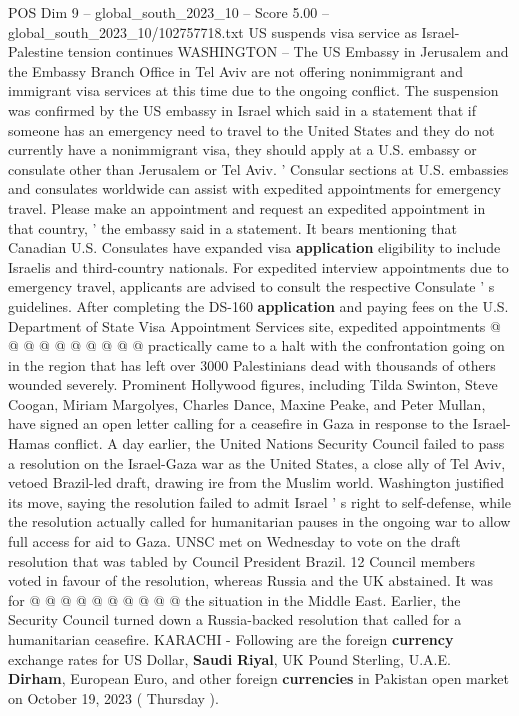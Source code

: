 \begin{textsample}{POS Dim 9 – global\_south\_2023\_10 – Score 5.00 – global\_south\_2023\_10/102757718.txt}  \label{ex:f9_pos_082}
US suspends visa service as Israel-Palestine tension continues WASHINGTON -- The US Embassy in Jerusalem and the Embassy Branch Office in Tel Aviv are not offering nonimmigrant and immigrant visa services at this time due to the ongoing conflict.
The suspension was confirmed by the US embassy in Israel which said in a statement that if someone has an emergency need to travel to the United States and they do not currently have a nonimmigrant visa, they should apply at a U.S. embassy or consulate other than Jerusalem or Tel Aviv. ' Consular sections at U.S. embassies and consulates worldwide can assist with expedited appointments for emergency travel.
Please make an appointment and request an expedited appointment in that country, ' the embassy said in a statement.
It bears mentioning that Canadian U.S.
Consulates have expanded visa \textbf{application} eligibility to include Israelis and third-country nationals.
For expedited interview appointments due to emergency travel, applicants are advised to consult the respective Consulate ' s guidelines.
After completing the DS-160 \textbf{application} and paying fees on the U.S.
Department of State Visa Appointment Services site, expedited appointments @ @ @ @ @ @ @ @ @ @ practically came to a halt with the confrontation going on in the region that has left over 3000 Palestinians dead with thousands of others wounded severely.
Prominent Hollywood figures, including Tilda Swinton, Steve Coogan, Miriam Margolyes, Charles Dance, Maxine Peake, and Peter Mullan, have signed an open letter calling for a ceasefire in Gaza in response to the Israel-Hamas conflict.
A day earlier, the United Nations Security Council failed to pass a resolution on the Israel-Gaza war as the United States, a close ally of Tel Aviv, vetoed Brazil-led draft, drawing ire from the Muslim world.
Washington justified its move, saying the resolution failed to admit Israel ' s right to self-defense, while the resolution actually called for humanitarian pauses in the ongoing war to allow full access for aid to Gaza.
UNSC met on Wednesday to vote on the draft resolution that was tabled by Council President Brazil. 12 Council members voted in favour of the resolution, whereas Russia and the UK abstained.
It was for @ @ @ @ @ @ @ @ @ @ the situation in the Middle East.
Earlier, the Security Council turned down a Russia-backed resolution that called for a humanitarian ceasefire.
KARACHI - Following are the foreign \textbf{currency} exchange rates for US Dollar, \textbf{Saudi} \textbf{Riyal}, UK Pound Sterling, U.A.E. \textbf{Dirham}, European Euro, and other foreign \textbf{currencies} in Pakistan open market on October 19, 2023 ( Thursday ).

\end{textsample}
